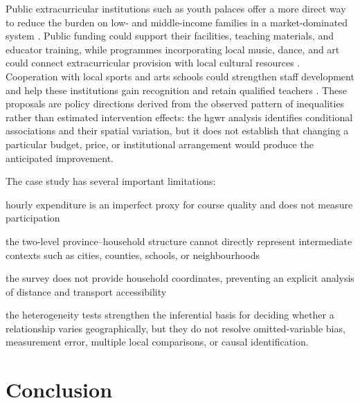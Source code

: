 \documentclass[times]{interact}
\theoremstyle{plain}%
\theoremstyle{definition}
\theoremstyle{remark}
\begin{document}
Public extracurricular institutions such as youth palaces offer a more direct way to reduce the burden on low- and middle-income families in a market-dominated system \citep{KerrAinscow-2022,ZhangDong-2023,LaiXu-2023,Ren-2018-en}.
Public funding could support their facilities, teaching materials, and educator training, while programmes incorporating local music, dance, and art could connect extracurricular provision with local cultural resources \citep{Xie-2022}.
Cooperation with local sports and arts schools could strengthen staff development and help these institutions gain recognition and retain qualified teachers \citep{Bao-2024-en}.
These proposals are policy directions derived from the observed pattern of inequalities rather than estimated intervention effects: the \gls{hgwr} analysis identifies conditional associations and their spatial variation, but it does not establish that changing a particular budget, price, or institutional arrangement would produce the anticipated improvement.

The case study has several important limitations:
\begin{enumerate*}[label={\alph*)}, after=\unskip{.}, itemjoin={{; }}, itemjoin*={{; and }}]
  \item hourly expenditure is an imperfect proxy for course quality and does not measure participation
  \item the two-level province--household structure cannot directly represent intermediate contexts such as cities, counties, schools, or neighbourhoods
  \item the survey does not provide household coordinates, preventing an explicit analysis of distance and transport accessibility
  \item the heterogeneity tests strengthen the inferential basis for deciding whether a relationship varies geographically, but they do not resolve omitted-variable bias, measurement error, multiple local comparisons, or causal identification.
\end{enumerate*}


\section{Conclusion}\label{sec:conclusion}
\end{document}

